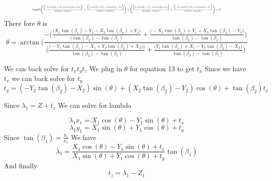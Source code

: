 \documentclass[11pt,english]{article}
\begin{document}
\begin{enumerate}
\begin{equation}
\resizebox{.8\hsize}{!}{$
\tan(\theta) \Bigg(\frac{\Big(-Y_1 \tan(\beta_1) -X_1 + Y_2 \tan(\beta_2) + X_2 )\Big) }{\tan(\beta_2) -\tan(\beta_1)} +\frac{\Big(Y_1 \tan(\beta_1) +X_1 - Y_3 \tan(\beta_3) - X_3 \Big)}{\tan(\beta_3) - \tan(\beta_1)} \Bigg) + \Bigg( \frac{\Big( X_1 \tan(\beta_1)  -Y_1 - X_2\tan(\beta_2) + Y_2\Big) } {(\tan(\beta_2) - \tan(\beta_1)} + \frac{ \Big(- X_1 \tan(\beta_1)  +Y_1 +X_3\tan(\beta_3) - Y_3\Big)}{\tan(\beta_3) - \tan(\beta_1)} \Bigg) = 0
$}
\end{equation}
There fore $\theta$ is 
$$
\theta = \arctan(\frac{-\Bigg( \frac{\Big( X_1 \tan(\beta_1)  -Y_1 - X_2\tan(\beta_2) + Y_2\Big) } {(\tan(\beta_2) - \tan(\beta_1)} + \frac{ \Big(- X_1 \tan(\beta_1)  +Y_1 +X_3\tan(\beta_3) - Y_3\Big)}{\tan(\beta_3) - \tan(\beta_1)} \Bigg)}{ \Bigg(\frac{\Big(-Y_1 \tan(\beta_1) -X_1 + Y_2 \tan(\beta_2) + X_2 )\Big) }{\tan(\beta_2) -\tan(\beta_1)} +\frac{\Big(Y_1 \tan(\beta_1) +X_1 - Y_3 \tan(\beta_3) - X_3 \Big)}{\tan(\beta_3) - \tan(\beta_1)} \Bigg)}
$$ 

We can back solve for $t_x t_y t_z$  
We plug in $\theta $ for equation 13 to get $t_x$ 
Since we have $t_x$ we can back solve for $t_y$ 
$$
t_y = (-Y_2 \tan(\beta_2) - X_2)\sin(\theta) + (X_2 \tan(\beta_2) - Y_2 )\cos(\theta) + \tan(\beta_2)t_x  
$$

Since 
$ \lambda_1 = Z + t_z $ 
We can solve for lambda   

$$
\lambda_1 x_1 = X_1 \cos(\theta) - Y_1 \sin(\theta) + t_x 
$$
$$
\lambda_1 y_1 = X_1 \sin(\theta) + Y_1 \cos(\theta) + t_y
$$
Since $\tan(\beta_1) = \frac{y_1}{x_1}$ 
We have 
$$
\lambda_1 = \frac{X_1 \cos(\theta) - Y_1 \sin(\theta) + t_x} { X_1 \sin(\theta) + Y_1 \cos(\theta) + t_y} \tan(\beta_1) 
$$
And finally 
\begin{equation}
t_z = \lambda_1 - Z_1 
\end{equation}


\end{enumerate}
\end{document}
